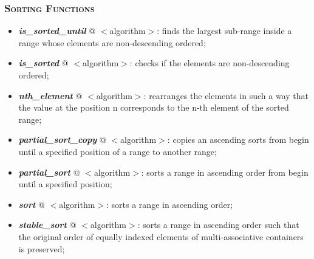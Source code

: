 \documentclass[10pt]{article}
\begin{document}
\begin{multicols*}{4}
{\subsubsection*{\textsc{Sorting Functions}} 
\begin{itemize}[leftmargin=*,topsep=0.25pt]
  \setlength\itemsep{-1.8pt}
	\item  \emph{\textbf{is\_sorted\_until}} @ $<$algorithm$>$: finds the largest sub-range inside a range whose elements are non-descending ordered;
	\item  \emph{\textbf{is\_sorted}} @ $<$algorithm$>$: checks if the elements are non-descending ordered;
	\item  \emph{\textbf{nth\_element}} @ $<$algorithm$>$: rearranges the elements in such a way that the value at the position n corresponds to the n-th element of the sorted range;
	\item  \emph{\textbf{partial\_sort\_copy}} @ $<$algorithm$>$: copies an ascending sorts from begin until a specified position of a range to another range;
	\item  \emph{\textbf{partial\_sort}} @ $<$algorithm$>$: sorts a range in ascending order from begin until a specified position;
	\item  \emph{\textbf{sort}} @ $<$algorithm$>$: sorts a range in ascending order;
	\item  \emph{\textbf{stable\_sort}} @ $<$algorithm$>$: sorts a range in ascending order such that the original order of equally indexed elements of multi-associative containers is preserved;
\end{itemize}

}
\end{multicols*}
\end{document}

